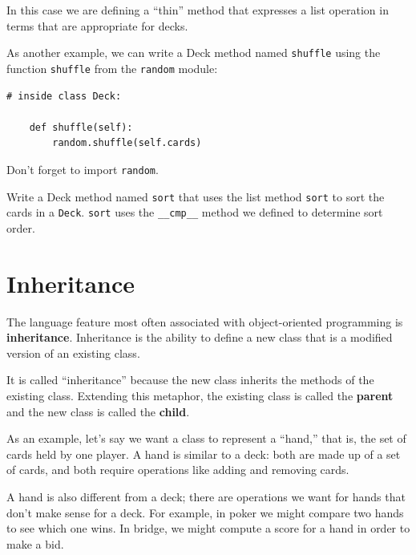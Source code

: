 \documentclass[10pt]{book}
\begin{document}
In this case we are defining a ``thin'' method that expresses
a list operation in terms that are appropriate for decks.

As another example, we can write a Deck method named {\tt shuffle}
using the function {\tt shuffle} from the {\tt random} module:

\begin{verbatim}
# inside class Deck:
            
    def shuffle(self):
        random.shuffle(self.cards)
\end{verbatim}
%
Don't forget to import {\tt random}.

\begin{exercise}

Write a Deck method named {\tt sort} that uses the list method
{\tt sort} to sort the cards in a {\tt Deck}.  {\tt sort} uses
the \verb"__cmp__" method we defined to determine sort order.
\end{exercise}



\section{Inheritance}

The language feature most often associated with object-oriented
programming is {\bf inheritance}.  Inheritance is the ability to
define a new class that is a modified version of an existing
class.

It is called ``inheritance'' because the new class inherits the
methods of the existing class.  Extending this metaphor, the existing
class is called the {\bf parent} and the new class is
called the {\bf child}.

As an example, let's say we want a class to represent a ``hand,''
that is, the set of cards held by one player.  A hand is similar to a
deck: both are made up of a set of cards, and both require operations
like adding and removing cards.

A hand is also different from a deck; there are operations we want for
hands that don't make sense for a deck.  For example, in poker we
might compare two hands to see which one wins.  In bridge, we might
compute a score for a hand in order to make a bid.
\end{document}
